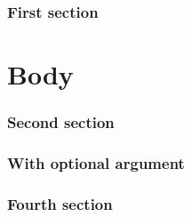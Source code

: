 \documentclass{article}
\begin{document}
\section{First section}

\lipsum

\part{Body}

\section*{Second section}

\lipsum

\section[Optional argument]{With optional argument}

\lipsum


\section*[Starred with optional argument]{Fourth section}

\lipsum
\end{document}
